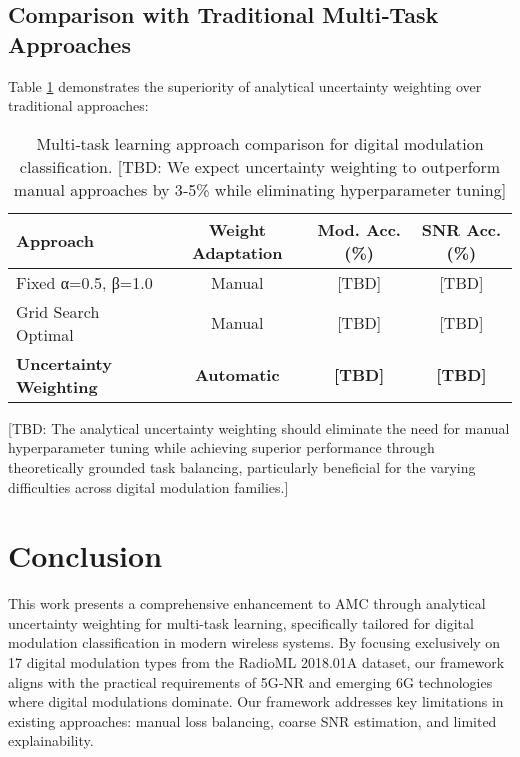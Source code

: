 \documentclass{ELSP}
\begin{document}
\subsection{Comparison with Traditional Multi‑Task Approaches}

Table \ref{tab:mtl_comparison} demonstrates the superiority of analytical uncertainty weighting over traditional approaches:

\begin{table}[H]
\centering
\begin{tabular}{lccc}
\toprule
\textbf{Approach} & \textbf{Weight Adaptation} & \textbf{Mod. Acc. (\%)} & \textbf{SNR Acc. (\%)} \\
\midrule
Fixed α=0.5, β=1.0 & Manual & [TBD] & [TBD] \\
Grid Search Optimal & Manual & [TBD] & [TBD] \\
\textbf{Uncertainty Weighting} & \textbf{Automatic} & \textbf{[TBD]} & \textbf{[TBD]} \\
\bottomrule
\end{tabular}
\caption{Multi‑task learning approach comparison for digital modulation classification. [TBD: We expect uncertainty weighting to outperform manual approaches by 3‑5\% while eliminating hyperparameter tuning]}
\label{tab:mtl_comparison}
\end{table}

[TBD: The analytical uncertainty weighting should eliminate the need for manual hyperparameter tuning while achieving superior performance through theoretically grounded task balancing, particularly beneficial for the varying difficulties across digital modulation families.]

\section{Conclusion}

This work presents a comprehensive enhancement to AMC through analytical uncertainty weighting for multi‑task learning, specifically tailored for digital modulation classification in modern wireless systems. By focusing exclusively on 17 digital modulation types from the RadioML 2018.01A dataset, our framework aligns with the practical requirements of 5G‑NR and emerging 6G technologies where digital modulations dominate. Our framework addresses key limitations in existing approaches: manual loss balancing, coarse SNR estimation, and limited explainability.
\end{document}
